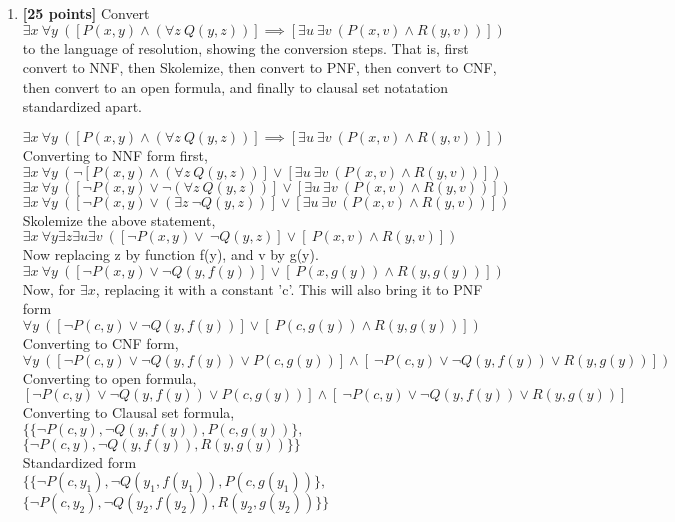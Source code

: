 \documentclass{article}
\begin{document}
\begin{enumerate}
\item \textbf{[25 points]} Convert
  $\exists x\ \forall y\ ([P(x,y) \land (\forall z\ Q(y,z))] \implies
  [\exists u\ \exists v\ (P(x,v) \land R(y,v))])$ to the language of
  resolution, showing the conversion steps.  That is, first convert to
  NNF, then Skolemize, then convert to PNF, then convert to CNF, then
  convert to an open formula, and finally to clausal set notatation
  standardized apart.
  \begin{answer}
  $\exists x\ \forall y\ ([P(x,y) \land (\forall z\ Q(y,z))] \implies [\exists u\ \exists v\ (P(x,v) \land R(y,v))])$\\
  Converting to NNF form first,\\
  $\exists x\ \forall y\ (\neg [P(x,y) \land (\forall z\ Q(y,z))] \lor [\exists u\ \exists v\ (P(x,v) \land R(y,v))])$\\
  $\exists x\ \forall y\ ( [\neg P(x,y) \lor \neg (\forall z\ Q(y,z))] \lor [\exists u\ \exists v\ (P(x,v) \land R(y,v))])$\\
  $\exists x\ \forall y\ ( [\neg P(x,y) \lor (\exists z\ \neg Q(y,z))] \lor [\exists u\ \exists v\ (P(x,v) \land R(y,v))])$\\
  Skolemize the above statement,\\
  $\exists x\ \forall y \exists z \exists u \exists v \ ( [\neg P(x,y) \lor \ \neg Q(y,z)] \lor [\  P(x,v) \land R(y,v)])$\\
  Now replacing z by function f(y), and v by g(y).\\
  $\exists x\ \forall y \ ( [\neg P(x,y) \lor \neg Q(y,f(y))] \lor [\  P(x,g(y)) \land R(y,g(y))])$\\
  Now, for $\exists x$, replacing it with a constant 'c'. This will also bring it to PNF form\\
  $\forall y \ ( [\neg P(c,y) \lor \neg Q(y,f(y))] \lor [\  P(c,g(y)) \land R(y,g(y))])$\\
  Converting to CNF form,\\
  $\forall y \ ( [\neg P(c,y) \lor \neg Q(y,f(y)) \lor P(c,g(y))] \land [\ \neg P(c,y) \lor \neg Q(y,f(y)) \lor  R(y,g(y))])$\\
  Converting to open formula,\\
    $ [\neg P(c,y) \lor \neg Q(y,f(y)) \lor P(c,g(y))] \land [\ \neg P(c,y) \lor \neg Q(y,f(y)) \lor  R(y,g(y))]$\\
  Converting to Clausal set formula,\\
    $ \{\{\neg P(c,y), \neg Q(y,f(y)), P(c,g(y))\},$ \\
    $\{\neg P(c,y), \neg Q(y,f(y)), R(y,g(y))\}\}$\\
    Standardized form\\
    $ \{\{\neg P(c,y_1), \neg Q(y_1,f(y_1)), P(c,g(y_1))\},$ \\
    $\{\neg P(c,y_2), \neg Q(y_2,f(y_2)), R(y_2,g(y_2))\}\}$\\
  \end{answer}

\end{enumerate}
\end{document}

